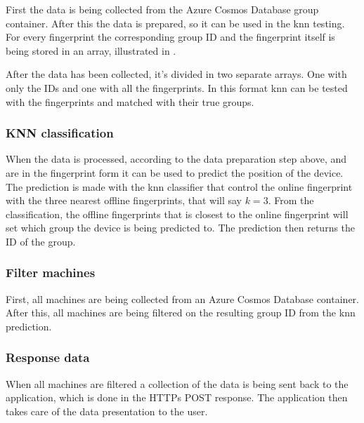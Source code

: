 \bigskip

First the data is being collected from the Azure Cosmos Database group container. 
After this the data is prepared, so it can be used in the \acrshort{knn} testing.
For every fingerprint the corresponding group ID and the fingerprint itself is being stored in an array, illustrated in .


After the data has been collected, it's divided in two separate arrays.
One with only the IDs and one with all the fingerprints.
In this format \acrshort{knn} can be tested with the fingerprints and matched with their true groups.


\subsubsection{KNN classification}\label{sec:implServerSetPosKnnClassification}
When the data is processed, according to the data preparation step above, and are in the fingerprint form it can be used to predict the position of the device.
The prediction is made with the \acrshort{knn} classifier that control the online fingerprint with the three nearest offline fingerprints, that will say $k=3$.
From the classification, the offline fingerprints that is closest to the online fingerprint will set which group the device is being predicted to.
The prediction then returns the ID of the group.

\subsubsection{Filter machines}\label{sec:implServerSetPosFilterMachines}
First, all machines are being collected from an Azure Cosmos Database container.
After this, all machines are being filtered on the resulting group ID from the \acrshort{knn} prediction.

\subsubsection{Response data}\label{sec:implServerSetPosResponse}
When all machines are filtered a collection of the data is being sent back to the application, which is  done in the HTTPs POST response.
The application then takes care of the data presentation to the user. 

